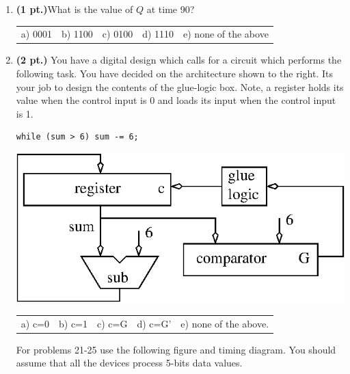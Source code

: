 \documentclass{article}
\begin{document}
\begin{enumerate}
\item {\bf (1 pt.)}What is the value of $Q$ at time 90?

\begin{tabular}{p{0.6in} p{0.6in} p{0.6in} p{0.6in} l}
a) 0001 & b) 1100 & c) 0100 & d) 1110 & e) none of the above
\end{tabular}

\item {\bf (2 pt.)} You have a digital design which calls for a circuit
which performs the following task.  You have decided on the architecture
shown to the right.  Its your job to design the contents of the glue-logic
box. Note, a register holds its value when the control input is 0 and 
loads its input when the control input is 1.

\begin{verbatim}
while (sum > 6) sum -= 6;
\end{verbatim}

\includegraphics{./Fig2/while6}

\begin{tabular}{p{0.6in} p{0.6in} p{0.6in} p{0.6in} l}
a) c=0 & b) c=1 & c) c=G & d) c=G' & e) none of the above.  
\end{tabular}

\pagebreak
For problems 21-25 use the following figure and timing diagram.
You should assume that all the devices process 5-bits data 
values.


\end{enumerate}
\end{document}
